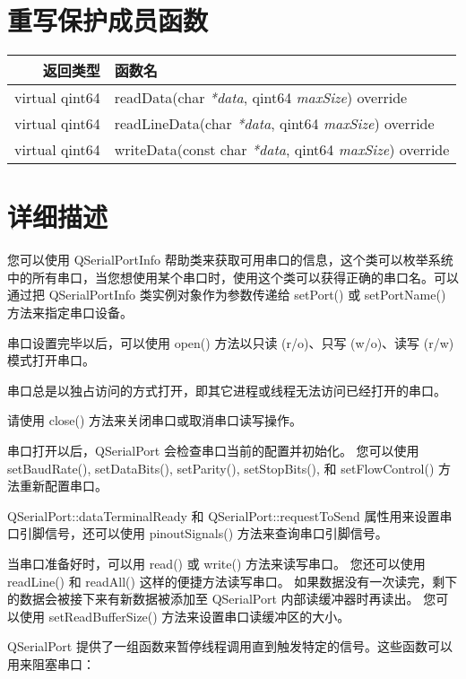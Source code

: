\section{重写保护成员函数}

\begin{tabular}{|r|l|}
\hline
返回类型&	函数名 \\ 
\hline
virtual qint64&	readData(char \emph{*data}, qint64 \emph{maxSize}) override \\
\hline
virtual qint64&	readLineData(char \emph{*data}, qint64 \emph{maxSize}) override \\ 
\hline
virtual qint64&	writeData(const char \emph{*data}, qint64 \emph{maxSize}) override \\ 
\hline
\end{tabular}



\section{详细描述}

您可以使用 QSerialPortInfo 帮助类来获取可用串口的信息，这个类可以枚举系统中的所有串口，当您想使用某个串口时，使用这个类可以获得正确的串口名。可以通过把 QSerialPortInfo 类实例对象作为参数传递给 setPort() 或 setPortName() 方法来指定串口设备。

串口设置完毕以后，可以使用 open() 方法以只读 (r/o)、只写 (w/o)、读写 (r/w) 模式打开串口。

\begin{notice}
串口总是以独占访问的方式打开，即其它进程或线程无法访问已经打开的串口。
\end{notice}

请使用 close() 方法来关闭串口或取消串口读写操作。

串口打开以后，QSerialPort 会检查串口当前的配置并初始化。
您可以使用 setBaudRate(), setDataBits(), setParity(), setStopBits(), 和 setFlowControl() 方法重新配置串口。

QSerialPort::dataTerminalReady 和 QSerialPort::requestToSend 属性用来设置串口引脚信号，还可以使用 pinoutSignals() 方法来查询串口引脚信号。

当串口准备好时，可以用 read() 或 write() 方法来读写串口。
您还可以使用 readLine() 和 readAll() 这样的便捷方法读写串口。
如果数据没有一次读完，剩下的数据会被接下来有新数据被添加至 QSerialPort 内部读缓冲器时再读出。
您可以使用 setReadBufferSize() 方法来设置串口读缓冲区的大小。

QSerialPort 提供了一组函数来暂停线程调用直到触发特定的信号。这些函数可以用来阻塞串口：

